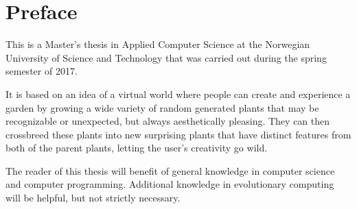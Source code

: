 \hypersetup{pageanchor=false}
%

\chapter*{Preface}
This is a Master's thesis in Applied Computer Science at the Norwegian University of Science and Technology that was carried out during the spring semester of 2017.

It is based on an idea of a virtual world where people can create and experience a garden by growing a wide variety of random generated plants that may be recognizable or unexpected, but always aesthetically pleasing.
They can then crossbreed these plants into new surprising plants that have distinct features from both of the parent plants, letting the user's creativity go wild.

The reader of this thesis will benefit of general knowledge in computer science and computer programming.
Additional knowledge in evolutionary computing will be helpful, but not strictly necessary.

\thesisdate \\[1pc]
\\[1pc]
